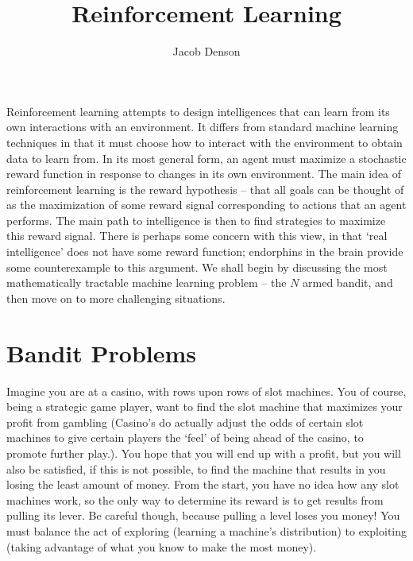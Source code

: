 

\title{Reinforcement Learning}
\author{Jacob Denson}



\maketitle
\tableofcontents
{}

\newpage

Reinforcement learning attempts to design intelligences that can learn from its own interactions with an environment. It differs from standard machine learning techniques in that it must choose how to interact with the environment to obtain data to learn from. In its most general form, an agent must maximize a stochastic reward function in response to changes in its own environment. The main idea of reinforcement learning is the reward hypothesis -- that all goals can be thought of as the maximization of some reward signal corresponding to actions that an agent performs. The main path to intelligence is then to find strategies to maximize this reward signal. There is perhaps some concern with this view, in that `real intelligence' does not have some reward function; endorphins in the brain provide some counterexample to this argument. We shall begin by discussing the most mathematically tractable machine learning problem -- the $N$ armed bandit, and then move on to more challenging situations.

\chapter{Bandit Problems}

Imagine you are at a casino, with rows upon rows of slot machines. You of course, being a strategic game player, want to find the slot machine that maximizes your profit from gambling (Casino's do actually adjust the odds of certain slot machines to give certain players the `feel' of being ahead of the casino, to promote further play.). You hope that you will end up with a profit, but you will also be satisfied, if this is not possible, to find the machine that results in you losing the least amount of money. From the start, you have no idea how any slot machines work, so the only way to determine its reward is to get results from pulling its lever. Be careful though, because pulling a level loses you money! You must balance the act of exploring (learning a machine's distribution) to exploiting (taking advantage of what you know to make the most money).

